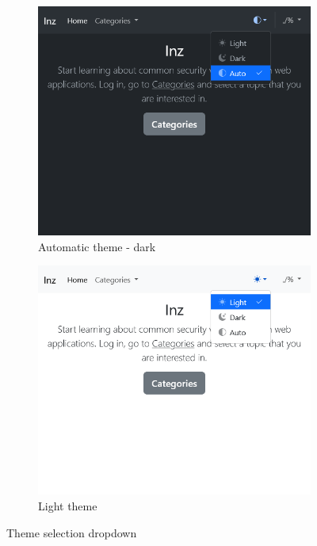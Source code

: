 \begin{figure}
    \centering
    \begin{subfigure}{0.48\textwidth}
        \includegraphics[width=\textwidth]{img/manual-theme-auto.png}
        \caption{Automatic theme - dark}
        \label{fig:manual-theme-auto}
    \end{subfigure}
    \hfill
    \begin{subfigure}{0.48\textwidth}
        \includegraphics[width=\textwidth]{img/manual-theme-light.png}
        \caption{Light theme}
        \label{fig:manual-theme-light}
    \end{subfigure}
    \caption{Theme selection dropdown}
    \label{fig:manual-theme}
\end{figure}

